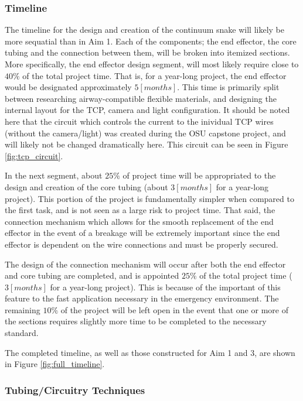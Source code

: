 	\subsubsection{Timeline}
	
		The timeline for the design and creation of the continuum snake will likely be more sequatial than in Aim 1. Each of the components; the end effector, the core tubing and the connection between them, will be broken into itemized sections. More specifically, the end effector design segment, will most likely require close to $40\%$ of the total project time. That is, for a year-long project, the end effector would be designated approximately $5[months]$. This time is primarily split between researching airway-compatible flexible materials, and designing the internal layout for the TCP, camera and light configuration. It should be noted here that the circuit which controls the current to the inividual TCP wires (without the camera/light) was created during the OSU capstone project, and will likely not be changed dramatically here. This circuit can be seen in Figure \ref{fig:tcp_circuit}.
		
		In the next segment, about $25\%$ of project time will be appropriated to the design and creation of the core tubing (about $3[months]$ for a year-long project). This portion of the project is fundamentally simpler when compared to the first task, and is not seen as a large risk to project time. That said, the connection mechanism which allows for the smooth replacement of the end effector in the event of a breakage will be extremely important since the end effector is dependent on the wire connections and must be properly secured.
		
		The design of the connection mechanism will occur after both the end effector and core tubing are completed, and is appointed $25\%$ of the total project time ($3[months]$ for a year-long project). This is because of the important of this feature to the fast application necessary in the emergency environment. The remaining $10\%$ of the project will be left open in the event that one or more of the sections requires slightly more time to be completed to the necessary standard.
		
		The completed timeline, as well as those constructed for Aim 1 and 3, are shown in Figure \ref{fig:full_timeline}.
	
	\subsubsection{Tubing/Circuitry Techniques}

